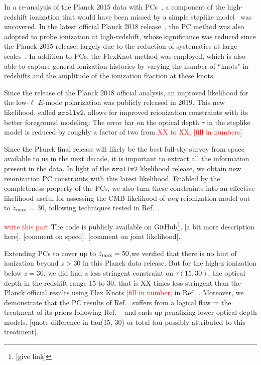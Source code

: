 \documentclass[prd,twocolumn,amsmath,amssymb,floatfix,superscriptaddress,nofootinbib]{revtex4-1}
\newcommand{\zmax}{z_{\rm max}}
\newcommand{\ch}[1]{\textcolor{red}{#1}}
\begin{document}
In a re-analysis of the Planck 2015 data with PCs~\cite{Heinrich:2016ojb}, a component of the high-redshift ionization that would have been missed by a simple steplike model~\cite{Heinrich:2016ojb} was uncovered. In the latest official Planck 2018 release~\cite{Aghanim:2018eyx}, the PC method was also adopted to probe ionization at high-redshift, whose significance was reduced since the Planck 2015 release, largely due to the reduction of systematics at large-scales~\cite{Aghanim:2018eyx, Heinrich:2018btc}. In addition to PCs, the FlexKnot method was employed, which is also able to capture general ionization histories by varying the number of ``knots" in redshifts and the amplitude of the ionization fraction at these knots. 

Since the release of the Planck 2018 official analysis, an improved likelihood for the low-$\ell$ $E$-mode polarization was publicly released in 2019. This new likelihood, called $\texttt{srollv2}$, allows for improved reionization constraints with its better foreground modeling: The error bar on the optical depth $\tau$ in the steplike model is reduced by roughly a factor of two from \ch{XX to XX. [fill in numbers]}

Since the Planck final release will likely be the best full-sky survey from space available to us in the next decade, it is important to extract all the information present in the data. In light of the $\texttt{srollv2}$ likelihood release, we obtain new reionization PC constraints with this latest likelihood. Enabled by the completeness property of the PCs, we also turn these constraints into an effective likelihood useful for assessing the CMB likelihood of \textit{any} reionization model out to $\zmax$ = 30, following techniques tested in Ref.~\cite{Heinrich:2016ojb}. 

\ch{write this part}
The code is publicly available on GitHub\footnote{[give link]}. [a bit more description here]. [comment on speed]. [comment on joint likelihood].

Extending PCs to cover up to $z_{\rm max} = 50$,we verified that there is no hint of ionization beyond $z>30$ in this Planck data release. But for the high-z ionization below $z=30$, we did find a less stringent constraint on $\tau(15, 30)$, the optical depth in the redshift range 15 to 30, that is XX times less stringent than the Planck official results using Flex Knots \ch{[fill in number]} in Ref.~\cite{Aghanim:2018eyx}. Moreover, we demonstrate that the PC results of Ref.~\cite{Aghanim:2018eyx} suffers from a logical flaw in the treatment of its priors following Ref.
~\cite{Millea:2018bko} and ends up penalizing lower optical depth models. [quote difference in tau(15, 30) or total tau possibly attributed to this treatment]. %
\end{document}

